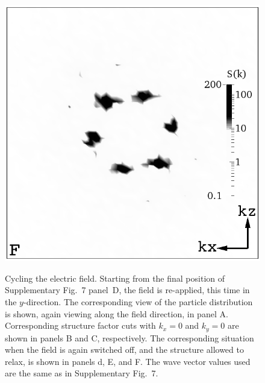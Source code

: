 \documentclass[12pt,twoside]{article}
\begin{document}
\begin{figure}[!h]
\begin{center}
\includegraphics[width=0.32\columnwidth]{sq_y_run1344.png}\\
\end{center}
\caption{Cycling the electric field. Starting from the final position of
Supplementary Fig.~7 panel~D, the field is re-applied, this time in the
$y$-direction. The corresponding view of the particle distribution is
shown, again viewing along the field direction, in panel A.
Corresponding structure factor cuts with $k_x = 0$ and $k_y = 0$ are
shown in panels B and C, respectively. The corresponding situation when
the field is again switched off, and the structure allowed to relax,
is shown in panels d, E, and F. The wave vector values used are the
same as in Supplementary Fig.~7.}
\end{figure}

\newpage
\end{document}
